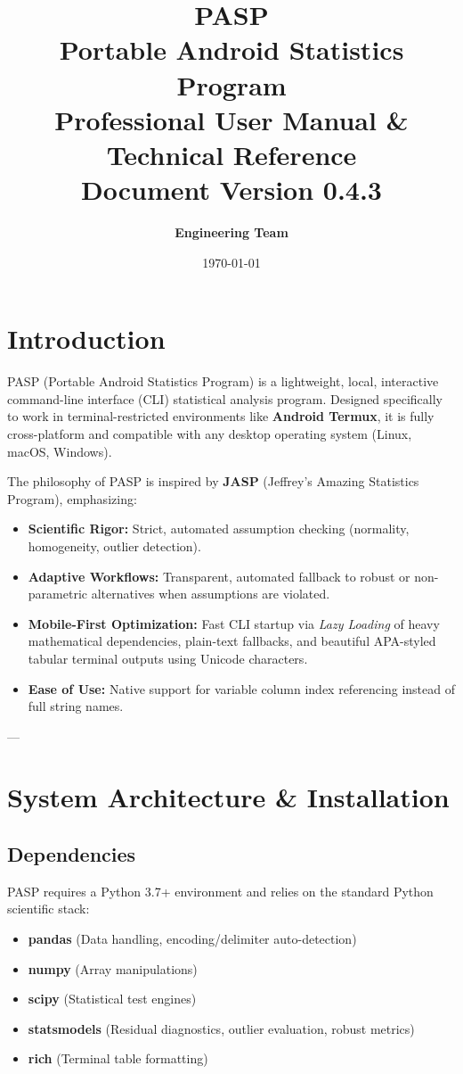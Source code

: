\documentclass[a4paper,11pt,oneside]{article}
\title{
    \vspace{-2cm}
    \textbf{\Huge PASP}\\
    \vspace{0.5cm}
    \textbf{\Large Portable Android Statistics Program}\\
    \vspace{1cm}
    \large Professional User Manual \& Technical Reference\\
    \small Document Version 0.4.3
}
\author{\textbf{Engineering Team}}
\date{\today}
\begin{document}
\maketitle
\thispagestyle{empty}
\newpage

\tableofcontents
\newpage

\section{Introduction}

\begin{tcolorbox}[colback=backcolour,colframe=primary,title=Project Philosophy]
PASP (Portable Android Statistics Program) is a lightweight, local, interactive command-line interface (CLI) statistical analysis program. Designed specifically to work in terminal-restricted environments like \textbf{Android Termux}, it is fully cross-platform and compatible with any desktop operating system (Linux, macOS, Windows).
\end{tcolorbox}

The philosophy of PASP is inspired by \textbf{JASP} (Jeffrey's Amazing Statistics Program), emphasizing:
\begin{itemize}
    \item \textbf{Scientific Rigor:} Strict, automated assumption checking (normality, homogeneity, outlier detection).
    \item \textbf{Adaptive Workflows:} Transparent, automated fallback to robust or non-parametric alternatives when assumptions are violated.
    \item \textbf{Mobile-First Optimization:} Fast CLI startup via \emph{Lazy Loading} of heavy mathematical dependencies, plain-text fallbacks, and beautiful APA-styled tabular terminal outputs using Unicode characters.
    \item \textbf{Ease of Use:} Native support for variable column index referencing instead of full string names.
\end{itemize}

---

\section{System Architecture \& Installation}

\subsection{Dependencies}
PASP requires a Python 3.7+ environment and relies on the standard Python scientific stack:
\begin{itemize}
    \item \textbf{pandas} (Data handling, encoding/delimiter auto-detection)
    \item \textbf{numpy} (Array manipulations)
    \item \textbf{scipy} (Statistical test engines)
    \item \textbf{statsmodels} (Residual diagnostics, outlier evaluation, robust metrics)
    \item \textbf{rich} (Terminal table formatting)
\end{itemize}
\end{document}
